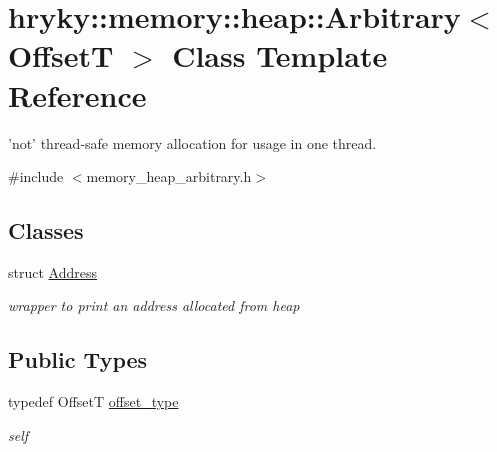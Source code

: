 \hypertarget{classhryky_1_1memory_1_1heap_1_1_arbitrary}{\section{hryky\-:\-:memory\-:\-:heap\-:\-:Arbitrary$<$ Offset\-T $>$ Class Template Reference}
\label{classhryky_1_1memory_1_1heap_1_1_arbitrary}
}


'not' thread-\/safe memory allocation for usage in one thread.  




{\ttfamily \#include $<$memory\-\_\-heap\-\_\-arbitrary.\-h$>$}

\subsection*{Classes}
\begin{DoxyCompactItemize}
\item 
struct \hyperlink{structhryky_1_1memory_1_1heap_1_1_arbitrary_1_1_address}{Address}
\begin{DoxyCompactList}\small\item\em wrapper to print an {\itshape address\/} allocated from {\itshape heap\/} \end{DoxyCompactList}\end{DoxyCompactItemize}
\subsection*{Public Types}
\begin{DoxyCompactItemize}
\item 
typedef Offset\-T \hyperlink{classhryky_1_1memory_1_1heap_1_1_arbitrary_a93027662f345b66e738ce8b2c9293e94}{offset\-\_\-type}
\begin{DoxyCompactList}\small\item\em self \end{DoxyCompactList}\end{DoxyCompactItemize}
